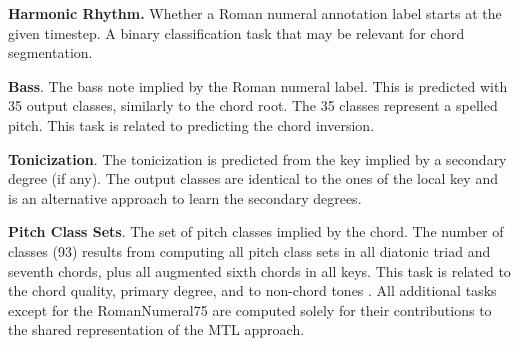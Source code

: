 \textbf{Harmonic Rhythm.} Whether a Roman numeral annotation
label starts at the given timestep. A binary classification
task that may be relevant for chord segmentation.

\textbf{Bass}. The bass note implied by the Roman numeral
label. This is predicted with 35 output classes, similarly
to the chord root. The 35 classes represent a spelled pitch.
This task is related to predicting the chord inversion.

\textbf{Tonicization}. The tonicization is predicted from
the key implied by a secondary degree (if any).
The output classes are identical to the ones of the local
key and is an alternative approach to learn the secondary
degrees.

\textbf{Pitch Class Sets}. The set of pitch classes implied
by the chord. The number of classes (93) results from
computing all pitch class sets in all diatonic triad and
seventh chords, plus all augmented sixth chords in all keys.
This task is related to the chord quality, primary degree,
and to non-chord tones \parencite{ju2017nonchord}. All additional
tasks except for the RomanNumeral75 are computed solely for
their contributions to the shared representation of the MTL
approach.
